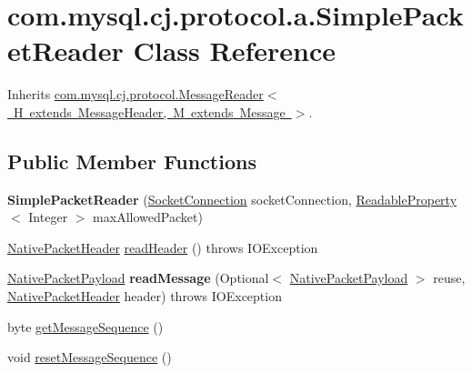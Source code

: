 \hypertarget{classcom_1_1mysql_1_1cj_1_1protocol_1_1a_1_1_simple_packet_reader}{}\section{com.\+mysql.\+cj.\+protocol.\+a.\+Simple\+Packet\+Reader Class Reference}
\label{classcom_1_1mysql_1_1cj_1_1protocol_1_1a_1_1_simple_packet_reader}


Inherits \mbox{\hyperlink{interfacecom_1_1mysql_1_1cj_1_1protocol_1_1_message_reader}{com.\+mysql.\+cj.\+protocol.\+Message\+Reader$<$ H extends Message\+Header, M extends Message $>$}}.

\subsection*{Public Member Functions}
\begin{DoxyCompactItemize}
\item 
\mbox{\label{classcom_1_1mysql_1_1cj_1_1protocol_1_1a_1_1_simple_packet_reader_a25bebda488bbc840c2ed840a576a76a0}} 
{\bfseries Simple\+Packet\+Reader} (\mbox{\hyperlink{interfacecom_1_1mysql_1_1cj_1_1protocol_1_1_socket_connection}{Socket\+Connection}} socket\+Connection, \mbox{\hyperlink{interfacecom_1_1mysql_1_1cj_1_1conf_1_1_readable_property}{Readable\+Property}}$<$ Integer $>$ max\+Allowed\+Packet)
\item 
\mbox{\hyperlink{classcom_1_1mysql_1_1cj_1_1protocol_1_1a_1_1_native_packet_header}{Native\+Packet\+Header}} \mbox{\hyperlink{classcom_1_1mysql_1_1cj_1_1protocol_1_1a_1_1_simple_packet_reader_a2f65d760ce356bbb432f3d8e804a24bc}{read\+Header}} ()  throws I\+O\+Exception 
\item 
\mbox{\label{classcom_1_1mysql_1_1cj_1_1protocol_1_1a_1_1_simple_packet_reader_a088f75ed6453acc78366cfb88b7b15a0}} 
\mbox{\hyperlink{classcom_1_1mysql_1_1cj_1_1protocol_1_1a_1_1_native_packet_payload}{Native\+Packet\+Payload}} {\bfseries read\+Message} (Optional$<$ \mbox{\hyperlink{classcom_1_1mysql_1_1cj_1_1protocol_1_1a_1_1_native_packet_payload}{Native\+Packet\+Payload}} $>$ reuse, \mbox{\hyperlink{classcom_1_1mysql_1_1cj_1_1protocol_1_1a_1_1_native_packet_header}{Native\+Packet\+Header}} header)  throws I\+O\+Exception 
\item 
byte \mbox{\hyperlink{classcom_1_1mysql_1_1cj_1_1protocol_1_1a_1_1_simple_packet_reader_ac89192017a4a7eb78ab9679925857fd6}{get\+Message\+Sequence}} ()
\item 
void \mbox{\hyperlink{classcom_1_1mysql_1_1cj_1_1protocol_1_1a_1_1_simple_packet_reader_a2dc67eb25eaee9e611b6fe3e9876877a}{reset\+Message\+Sequence}} ()
\end{DoxyCompactItemize}
